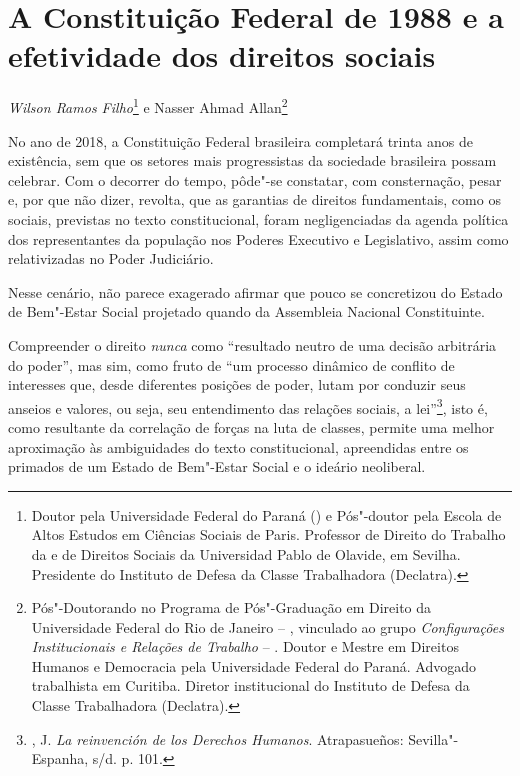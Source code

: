 \chapter*{A Constituição Federal de 1988 e a efetividade dos direitos sociais}


\begin{flushright}
\emph{Wilson Ramos Filho}\footnote{Doutor pela Universidade Federal do
  Paraná () e Pós"-doutor pela Escola de Altos Estudos em Ciências
  Sociais de Paris. Professor de Direito do Trabalho da  e de
  Direitos Sociais da Universidad Pablo de Olavide, em Sevilha.
  Presidente do Instituto de Defesa da Classe Trabalhadora (Declatra).}
e Nasser Ahmad Allan\footnote{Pós"-Doutorando no Programa de Pós"-Graduação
  em Direito da Universidade Federal do Rio de Janeiro -- , vinculado
  ao grupo \emph{Configurações Institucionais e Relações de Trabalho} --
  . Doutor e Mestre em Direitos Humanos e Democracia pela
  Universidade Federal do Paraná. Advogado trabalhista em Curitiba.
  Diretor institucional do Instituto de Defesa da Classe Trabalhadora
  (Declatra).}
\end{flushright}

No ano de 2018, a Constituição Federal brasileira completará trinta anos
de existência, sem que os setores mais progressistas da sociedade
brasileira possam celebrar. Com o decorrer do tempo, pôde"-se constatar,
com consternação, pesar e, por que não dizer, revolta, que as garantias
de direitos fundamentais, como os sociais, previstas no texto
constitucional, foram negligenciadas da agenda política dos
representantes da população nos Poderes Executivo e Legislativo, assim
como relativizadas no Poder Judiciário.

Nesse cenário, não parece exagerado afirmar que pouco se concretizou do
Estado de Bem"-Estar Social projetado quando da Assembleia Nacional
Constituinte.

Compreender o direito \emph{nunca} como ``resultado neutro de uma
decisão arbitrária do poder'', mas sim, como fruto de ``um processo
dinâmico de conflito de interesses que, desde diferentes posições de
poder, lutam por conduzir seus anseios e valores, ou seja, seu
entendimento das relações sociais, a lei''\footnote{, J.
  \emph{La reinvención de los Derechos Humanos}. Atrapasueños:
  Sevilla"-Espanha, s/d. p. 101.}, isto é, como resultante da correlação
de forças na luta de classes, permite uma melhor aproximação às
ambiguidades do texto constitucional, apreendidas entre os primados de
um Estado de Bem"-Estar Social e o ideário neoliberal.

